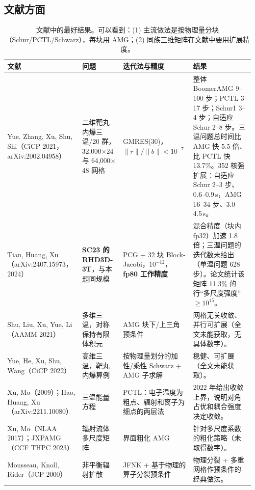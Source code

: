\documentclass[11pt,a4paper]{ctexart}
\begin{document}
\subsection{文献方面}
\begin{table}[H]
\centering
\small
\begin{tabular}{p{3.2cm}p{3.2cm}p{2.4cm}p{6.2cm}}
\toprule
文献 & 问题 & 迭代法与精度 & 结果 \\
\midrule
Yue, Zhang, Xu, Shu, Shi（CiCP 2021，arXiv:2002.04958） & 二维靶丸内爆三温/20 群，32,000$\times$24 与 64,000$\times$48 网格 & GMRES(30)，$\|r\|/\|b\|<10^{-7}$ &
整体 BoomerAMG 9--100 步；PCTL 3--17 步；Schur1 3--4 步；自适应 Schur 2--8 步。三温问题总时间比 AMG 快 5.5 倍、比 PCTL 快 13.7\%。352 核强扩展：自适应 Schur 2--3 步、0.6--0.9\,s，AMG 16--34 步、3.0--4.5\,s。\\
\addlinespace
Tian, Huang, Xu（arXiv:2407.15973，2024） & \textbf{SC23 的 RHD3D-3T}，与本题同规模 & PCG + 32 块 Block-Jacobi，$10^{-12}$，\textbf{fp80 工作精度} &
混合精度（块内 fp32）加速 1.8 倍；三温问题的迭代数未给出（单温问题 628 步）。论文统计该矩阵 11.3\% 的行“多尺度强度”$\ge10^{15}$。\\
\addlinespace
Shu, Liu, Xu, Yue, Li（AAMM 2021） & 多维三温，对称保持有限体积元 & AMG 块下/上三角预条件 & 网格无关收敛、并行可扩展（全文未能获取，无具体数字）。\\
\addlinespace
Yue, He, Xu, Shu, Wang（CiCP 2022） & 高维三温，靶丸内爆算例 & 按物理量划分的加性/乘性 Schwarz + AMG 子求解 & 稳健、可扩展（全文未能获取）。\\
\addlinespace
Xu, Mo（2009）；Hao, Huang, Xu（arXiv:2211.10080） & 三温能量方程 & PCTL：电子温度为粗点、辐射和离子为细点的两层法 & 2022 年给出收敛上界，说明对角占优和耦合强度决定收敛。\\
\addlinespace
Xu, Mo（NLAA 2017）；JXPAMG（CCF THPC 2023） & 辐射流体多尺度矩阵 & 界面粗化 AMG & 针对多尺度系数的粗化策略（未取得数字）。\\
\addlinespace
Mousseau, Knoll, Rider（JCP 2000） & 非平衡辐射扩散 & JFNK + 基于物理的算子分裂预条件 & 物理分裂 + 多重网格作预条件的经典做法。\\
\bottomrule
\end{tabular}
\caption{文献中的最好结果。可以看到：(1) 主流做法是按物理量分块（Schur/PCTL/Schwarz），每块用 AMG；(2) 同族三维矩阵在文献中要用扩展精度。}
\end{table}
\end{document}
